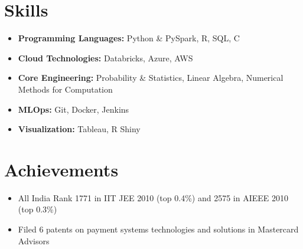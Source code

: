 \documentclass[a4paper,12pt]{article}
\begin{document}
\section*{Skills}
\begin{itemize}[leftmargin=0.2cm, label={}]
    \item \textbf{Programming Languages:} Python \& PySpark, R, SQL, C
    \item \textbf{Cloud Technologies:} Databricks, Azure, AWS
    \item \textbf{Core Engineering:} Probability \& Statistics, Linear Algebra, Numerical Methods for Computation
    \item \textbf{MLOps:} Git, Docker, Jenkins
    \item \textbf{Visualization:} Tableau, R Shiny
\end{itemize}

\section*{Achievements}
\begin{itemize}[leftmargin=0.2cm, label={}]
    \item All India Rank 1771 in IIT JEE 2010 (top 0.4\%) and 2575 in AIEEE 2010 (top 0.3\%)
    \item Filed 6 patents on payment systems technologies and solutions in Mastercard Advisors
\end{itemize}
\end{document}
